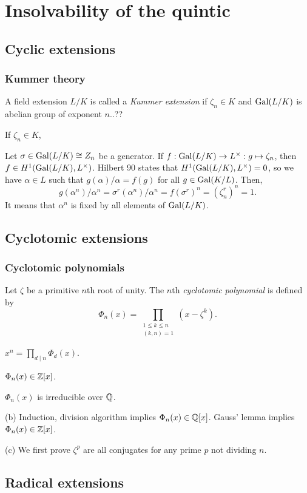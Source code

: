 \documentclass{../../large}
\begin{document}
\part{Insolvability of the quintic}


\chapter{Cyclic extensions}


\section{Kummer theory}

\begin{prb}
A field extension $L/K$ is called a \emph{Kummer extension} if $\zeta_n\in K$ and $\operatorname{Gal}(L/K)$ is abelian group of exponent $n$..??
\begin{parts}
\item If $\zeta_n\in K$, 
\end{parts}
\end{prb}
Let $\sigma\in\operatorname{Gal}(L/K)\cong Z_n$ be a generator.
If $f:\operatorname{Gal}(L/K)\to L^\times:g\mapsto\zeta_n$, then $f\in H^1(\operatorname{Gal}(L/K),L^\times)$.
Hilbert 90 states that $H^1(\operatorname{Gal}(L/K),L^\times)=0$, so we have $\alpha\in L$ such that $g(\alpha)/\alpha=f(g)$ for all $g\in\operatorname{Gal}(K/L)$.
Then,
\[g(\alpha^n)/\alpha^n=\sigma^r(\alpha^n)/\alpha^n=f(\sigma^r)^n=(\zeta_n^r)^n=1.\]
It means that $\alpha^n$ is fixed by all elements of $\operatorname{Gal}(L/K)$.


\chapter{Cyclotomic extensions}
\section{Cyclotomic polynomials}

\begin{prb}
Let $\zeta$ be a primitive $n$th root of unity.
The $n$th \emph{cyclotomic polynomial} is defined by
\[\Phi_n(x)=\prod_{\substack{1\le k\le n\\(k,n)=1}}(x-\zeta^k).\]
\begin{parts}
\item $x^n=\prod_{d\mid n}\Phi_d(x)$.
\item $\Phi_n(x)\in\mathbb{Z}[x]$.
\item $\Phi_n(x)$ is irreducible over $\mathbb{Q}$.
\end{parts}
\end{prb}
\begin{pf}

(b)
Induction, division algorithm implies $\Phi_n(x)\in\mathbb{Q}[x]$.
Gauss' lemma implies $\Phi_n(x)\in\mathbb{Z}[x]$.

(c)
We first prove $\zeta^p$ are all conjugates for any prime $p$ not dividing $n$.
\end{pf}

\begin{prb}

\end{prb}






\chapter{Radical extensions}
\end{document}
